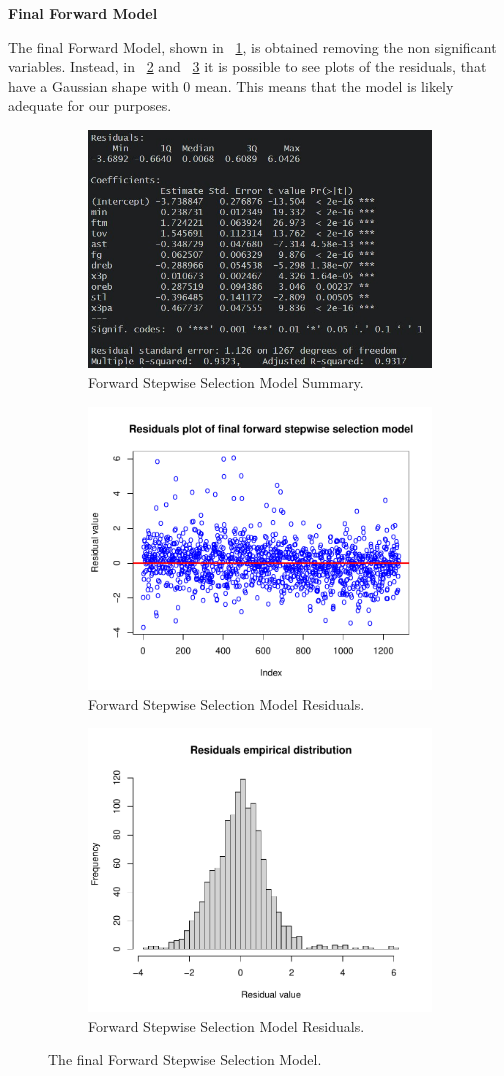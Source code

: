 \vspace{0.2cm}
\noindent
\textbf{Final Forward Model}

The final Forward Model, shown in \Fig~\ref{fig:ForwardFinalModelSummary}, is obtained removing the non significant variables. Instead, in \Fig~\ref{fig:ForwardFinalModelResiduals} and \Fig~\ref{fig:ForwardFinalModelResidualsDist} it is possible to see plots of the residuals, that have a Gaussian shape with 0 mean. This means that the model is likely adequate for our purposes.

\begin{figure}[h]
	\centering
	\begin{subfigure}{.6\textwidth}
		\centering
		\includegraphics[width=0.5\linewidth]{ImageFiles/Regression/Forward/ForwardFinalModelSummary}
		\caption{Forward Stepwise Selection Model Summary.}
		\label{fig:ForwardFinalModelSummary}
	\end{subfigure}
	\begin{subfigure}{.6\textwidth}
		\centering
		\includegraphics[width=0.5\linewidth]{ImageFiles/Regression/Forward/ForwardFinalModelResiduals}
		\caption{Forward Stepwise Selection Model Residuals.}
		\label{fig:ForwardFinalModelResiduals}
	\end{subfigure}%
	\begin{subfigure}{.6\textwidth}
		\centering
		\includegraphics[width=0.5\linewidth]{ImageFiles/Regression/Forward/ForwardFinalModelResidualsDist}
		\caption{Forward Stepwise Selection Model Residuals.}
		\label{fig:ForwardFinalModelResidualsDist}
	\end{subfigure}
	\caption{The final Forward Stepwise Selection Model.}
	\label{fig:FinalFSSM}
\end{figure}

